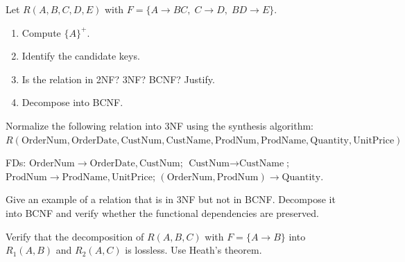 \begin{exercise}
Let $R(A, B, C, D, E)$ with $F = \{A \to BC, \; C \to D, \; BD \to E\}$.
\begin{enumerate}
    \item Compute $\{A\}^+$.
    \item Identify the candidate keys.
    \item Is the relation in 2NF? 3NF? BCNF? Justify.
    \item Decompose into BCNF.
\end{enumerate}
\end{exercise}

\begin{exercise}
Normalize the following relation into 3NF using the synthesis algorithm:
$R(\text{OrderNum}, \text{OrderDate}, \text{CustNum}, \text{CustName},
\text{ProdNum}, \text{ProdName}, \text{Quantity}, \text{UnitPrice})$

FDs: $\text{OrderNum} \to \text{OrderDate}, \text{CustNum}$;
$\text{CustNum} \to \text{CustName}$;
$\text{ProdNum} \to \text{ProdName}, \text{UnitPrice}$;
$(\text{OrderNum}, \text{ProdNum}) \to \text{Quantity}$.
\end{exercise}

\begin{exercise}
Give an example of a relation that is in 3NF but not in BCNF. Decompose
it into BCNF and verify whether the functional dependencies are preserved.
\end{exercise}

\begin{exercise}
Verify that the decomposition of $R(A, B, C)$ with $F = \{A \to B\}$ into
$R_1(A, B)$ and $R_2(A, C)$ is lossless. Use Heath's theorem.
\end{exercise}
